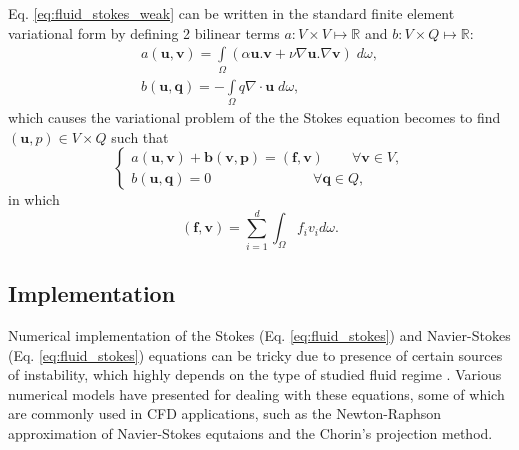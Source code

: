 Eq. \ref{eq:fluid_stokes_weak} can be written in the standard finite element variational form by defining 2 bilinear terms $a: V \times V \mapsto \mathbb{R}$ and $b: V \times Q \mapsto \mathbb{R}$:
\begin{equation}
\begin{array}{*{20}{l}}
\displaystyle  {a({\mathbf{u}},{\mathbf{v}}) = \int\limits_\Omega  {(\alpha {\mathbf{u}}.{\mathbf{v}} + \nu\nabla {\mathbf{u}}.\nabla {\mathbf{v}})\;d\omega ,} } \\ 
\displaystyle  {b({\mathbf{u}},{\mathbf{q}}) =  - \int\limits_\Omega  {q\nabla\cdot{\mathbf{u}}\;d\omega ,} } 
\end{array}
\end{equation}
which causes the variational problem of the the Stokes equation becomes to find $(\mathbf{u}, p) \in V \times Q$ such that
\begin{equation}
\left\{ {\begin{array}{*{20}{l}}
\displaystyle  {a({\mathbf{u}},{\mathbf{v}}) + {\mathbf{b}}({\mathbf{v}},{\mathbf{p}}) = ({\mathbf{f}},{\mathbf{v}})\qquad {\forall {\mathbf{v}}} \in V,} \\ 
\displaystyle  {b({\mathbf{u}},{\mathbf{q}}) = 0\qquad \qquad \qquad \quad \;{\forall {\mathbf{q}}} \in Q,} 
\end{array}} \right.
\end{equation}
in which
\begin{equation}
(\mathbf{f}, \mathbf{v})=\sum_{i=1}^{d} \int_{\Omega} f_{i} v_{i} d \omega.
\end{equation}


\subsection{Implementation}

Numerical implementation of the Stokes (Eq. \ref{eq:fluid_stokes}) and Navier-Stokes (Eq. \ref{eq:fluid_stokes}) equations can be tricky due to presence of certain sources of instability, which highly depends on the type of studied fluid regime \cite{Girault1979, Elman2014}. Various numerical models have presented for dealing with these equations, some of which are commonly used in CFD applications, such as the Newton-Raphson approximation of Navier-Stokes equtaions and the Chorin's projection method. 

